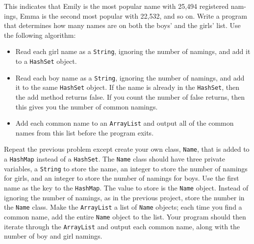 \begin{questions}
This indicates that Emily is the most popular name with 25,494 registered nam-
ings, Emma is the second most popular with 22,532, and so on.
Write a program that determines how many names are on both the boys’ and
the girls’ list. Use the following algorithm:
\begin{itemize}
  \item Read each girl name as a \texttt{String}, ignoring the number of namings, and add it to
a \texttt{HashSet} object.
  \item Read each boy name as a \texttt{String}, ignoring the number of namings, and add it to
the same \texttt{HashSet} object. If the name is already in the \texttt{HashSet}, then the add
method returns false. If you count the number of false returns, then this
gives you the number of common namings.
  \item Add each common name to an \texttt{ArrayList} and output all of the common names
from this list before the program exits.   
\end{itemize}

Repeat the previous problem except create your own class, \texttt{Name}, that is added to a
\texttt{HashMap} instead of a \texttt{HashSet}. The \texttt{Name} class should have three private variables,
a \texttt{String} to store the name, an integer to store the number of namings for girls,
and an integer to store the number of namings for boys. Use the first name as the
key to the \texttt{HashMap}. The value to store is the \texttt{Name} object. Instead of ignoring the
number of namings, as in the previous project, store the number in the \texttt{Name} class.
Make the \texttt{ArrayList} a list of \texttt{Name} objects; each time you find a common name,
add the entire \texttt{Name} object to the list. Your program should then iterate through
the \texttt{ArrayList} and output each common name, along with the number of boy and
girl namings.



\question


\end{questions}

